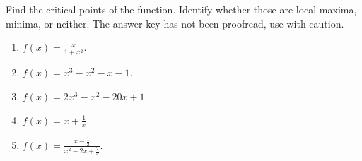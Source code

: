 Find the critical points of the function. Identify whether those are local maxima, minima, or neither. The answer key has not been proofread, use with caution.
\begin{multicols}{2}
\begin{enumerate}[ref={\fcProblemRef}]
\item $\displaystyle f(x)=\frac{x}{1+x^2}$.

\item $\displaystyle f(x)=x^3-x^2-x-1$.

\item $\displaystyle f(x)=2x^3-x^2-20x+1$.

\item $\displaystyle f(x)=x+\frac{1}{x}$.

\item $\displaystyle f(x)=\frac{x-\frac{1}{2}}{x^{2}-2 x+\frac{7}{4}} $.

\end{enumerate}
\end{multicols}
